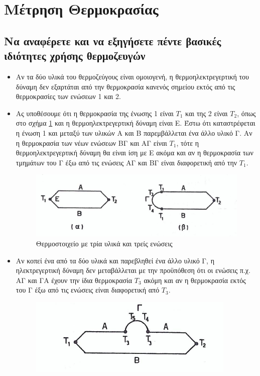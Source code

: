 \documentclass{article}
\begin{document}
\section{Μέτρηση Θερμοκρασίας}
\subsection{Να αναφέρετε και να εξηγήσετε πέντε βασικές ιδιότητες χρήσης θερμοζευγών}
\begin{itemize}
    \item Αν τα δύο υλικά του θερμοζεύγους είναι ομοιογενή, η θερμοηλεκτρεγερτική του δύναμη δεν εξαρτάται από την θερμοκρασία κανενός σημείου εκτός από τις θερμοκρασίες των ενώσεων 1
        και 2.
    \item Ας υποθέσουμε ότι η θερμοκρασία της ένωσης 1 είναι $Τ_1$ και της 2 είναι $Τ_2$, όπως στο σχήμα \ref{fig:7.1thermo1} και η θερμοηλεκτρεγερτική δύναμη είναι Ε. Έστω ότι καταστρέφεται η ένωση 1 και
        μεταξύ των υλικών Α και Β παρεμβάλλεται ένα άλλο υλικό Γ. Αν η θερμοκρασία των νέων ενώσεων ΒΓ και ΑΓ είναι $Τ_1$, τότε η θερμοηλεκτρεγερτική δύναμη θα είναι ίση με Ε ακόμα και αν
        η θερμοκρασία των τμημάτων του Γ έξω από τις ενώσεις ΑΓ και ΒΓ είναι διαφορετική από την $Τ_1$.
        \begin{figure}[h!]
            \includegraphics[width=\linewidth]{thermozevgi1.png}
            \caption{Θερμοστοιχείο με τρία υλικά και τρείς ενώσεις}
            \label{fig:7.1thermo1}
        \end{figure}
    \item Αν κοπεί ένα από τα δύο υλικά και παρεβληθεί ένα άλλο υλικό Γ, η ηλεκτρεγερτική δύναμη δεν μεταβάλλεται με την προϋπόθεση ότι οι ενώσεις π.χ. ΑΓ και ΓΑ έχουν την ίδια 
        θερμοκρασία $Τ_3$ ακόμη και αν η θερμοκρασία εκτός του Γ έξω από τις ενώσεις είναι διαφορετική από $Τ_3$.
        \begin{figure}[h!]
            \includegraphics[width=\linewidth]{thermozevgi2.png}

\end{figure}
\end{itemize}
\end{document}
